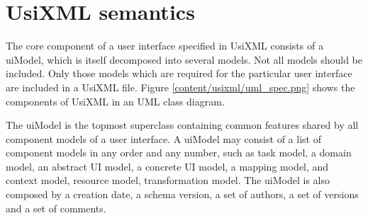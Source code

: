\section{UsiXML semantics}
\label{section:usixml_semantics}

The core component of a user interface specified in UsiXML
consists of a uiModel, which is itself decomposed into several models. Not all models should be included. Only those models which are required for the particular user interface are included in a UsiXML file. Figure \ref{content/usixml/uml_spec.png} shows the components of UsiXML in an UML class diagram.


The uiModel is the topmost superclass containing common features shared by all component models of a user interface. A uiModel may consist of a list of component models in any order and any number, such as task model, a domain model, an abstract UI model, a concrete UI model, a mapping model, and context model, resource model, transformation model. The uiModel is also composed by a creation date, a schema version, a set of authors, a set of versions and a set of comments.